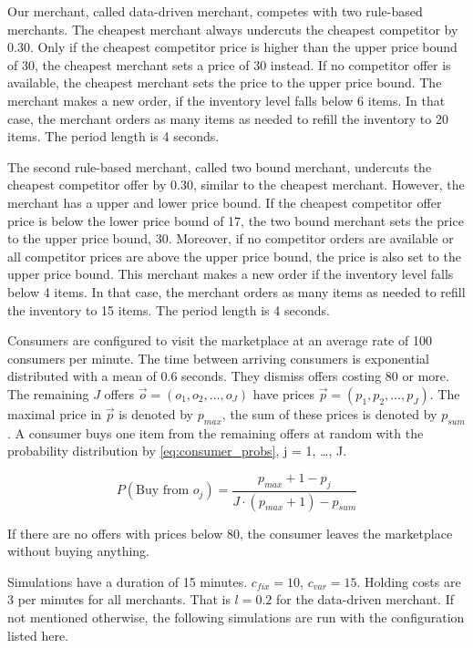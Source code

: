 Our merchant, called data-driven merchant, competes with two rule-based merchants.
The cheapest merchant always undercuts the cheapest competitor by 0.30.
Only if the cheapest competitor price is higher than the upper price bound of 30, the cheapest merchant sets a price of 30 instead.
If no competitor offer is available, the cheapest merchant sets the price to the upper price bound.
The merchant makes a new order, if the inventory level falls below 6 items.
In that case, the merchant orders as many items as needed to refill the inventory to 20 items.
The period length is 4 seconds.

The second rule-based merchant, called two bound merchant, undercuts the cheapest competitor offer by 0.30, similar to the cheapest merchant.
However, the merchant has a upper and lower price bound.
If the cheapest competitor offer price is below the lower price bound of 17, the two bound merchant sets the price to the upper price bound, 30.
Moreover, if no competitor orders are available or all competitor prices are above the upper price bound, the price is also set to the upper price bound.
This merchant makes a new order if the inventory level falls below 4 items.
In that case, the merchant orders as many items as needed to refill the inventory to 15 items.
The period length is 4 seconds.

Consumers are configured to visit the marketplace at an average rate of 100 consumers per minute.
The time between arriving consumers is exponential distributed with a mean of 0.6 seconds.
They dismiss offers costing 80 or more.
The remaining $J$ offers $\vec{o} = (o_1, o_2, \ldots, o_J)$ have prices $\vec{p} = (p_1, p_2, \ldots, p_J)$.
The maximal price in $\vec{p}$ is denoted by $p_{max}$, the sum of these prices is denoted by $p_{sum}$.
A consumer buys one item from the remaining offers at random with the probability distribution by \cref{eq:consumer_probs}, j = 1, \ldots, J.

\begin{equation}
P(\text{Buy from } o_j) = \frac{p_{max} + 1 - p_j}{J \cdot (p_{max} + 1) - p_{sum}}
\label{eq:consumer_probs}
\end{equation}

If there are no offers with prices below 80, the consumer leaves the marketplace without buying anything.

Simulations have a duration of 15 minutes.
$c_{fix} = 10$, $c_{var} = 15$.
Holding costs are 3 per minutes for all merchants.
That is $l = 0.2$ for the data-driven merchant.
If not mentioned otherwise, the following simulations are run with the configuration listed here.

